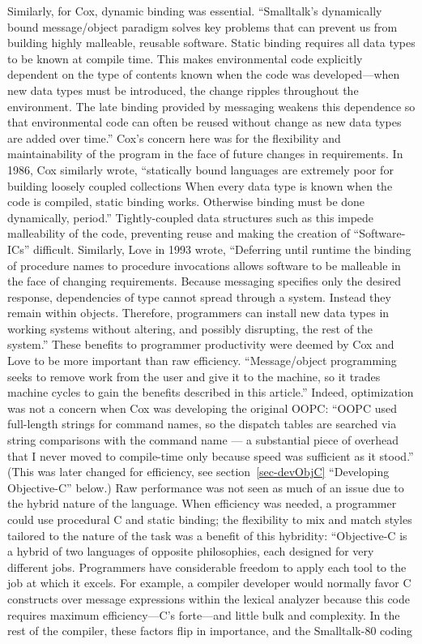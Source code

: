 \documentclass[acmsmall,screen]{acmart}
\begin{document}
Similarly, for Cox, dynamic binding was essential. ``Smalltalk's dynamically bound message/object paradigm solves key problems that can prevent us from building highly malleable, reusable software. Static binding requires all data types to be known at compile time. This makes environmental code explicitly dependent on the type of contents known when the code was developed---when new data types must be introduced, the change ripples throughout the environment. The late binding provided by messaging weakens this dependence so that environmental code can often be reused without change as new data types are added over time.'' \citep[61]{cox_message/object_1984} Cox's concern here was for the flexibility and maintainability of the program in the face of future changes in requirements. In 1986, Cox similarly wrote, ``statically bound languages are extremely poor for building loosely coupled collections\textellipsis{} When every data type is known when the code is compiled, static binding works. Otherwise binding must be done dynamically, period.'' \citep[24]{cox_object-oriented_1986} Tightly-coupled data structures such as this impede malleability of the code, preventing reuse and making the creation of ``Software-ICs'' difficult. Similarly, Love in 1993 wrote, ``Deferring until runtime the binding of procedure names to procedure invocations allows software to be malleable in the face of changing requirements.\textellipsis{} Because messaging specifies only the desired response, dependencies of type cannot spread through a system. Instead they remain within objects. Therefore, programmers can install new data types in working systems without altering, and possibly disrupting, the rest of the system.'' \citep[30]{love_object_1995} These benefits to programmer productivity were deemed by Cox and Love to be more important than raw efficiency. ``Message/object programming seeks to remove work from the user and give it to the machine, so it trades machine cycles to gain the benefits described in this article.'' \citep[60]{cox_message/object_1984} Indeed, optimization was not a concern when Cox was developing the original OOPC: ``OOPC used full-length strings for command names, so the dispatch tables are searched via string comparisons with the command name --- a substantial piece of overhead that I never moved to compile-time only because speed was sufficient as it stood.'' \citep[60]{cox_message/object_1983} (This was later changed for efficiency, see section~\ref{sec-devObjC} ``Developing Objective-C'' below.) Raw performance was not seen as much of an issue due to the hybrid nature of the language. When efficiency was needed, a programmer could use procedural C and static binding; the flexibility to mix and match styles tailored to the nature of the task was a benefit of this hybridity: ``Objective-C is a hybrid of two languages of opposite philosophies, each designed for very different jobs. Programmers have considerable freedom to apply each tool to the job at which it excels. For example, a compiler developer would normally favor C constructs over message expressions within the lexical analyzer because this code requires maximum efficiency---C's forte---and little bulk and complexity. In the rest of the compiler, these factors flip in importance, and the Smalltalk-80 coding 
\end{document}
